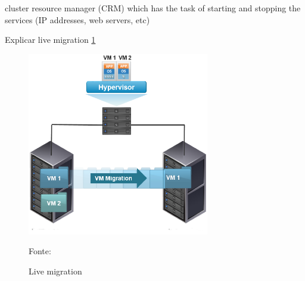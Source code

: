 cluster resource manager (CRM) which has the task of starting and stopping the services (IP addresses, web servers, etc)


Explicar live migration \ref{fig:vms_migration}

\begin{figure}[h!]
 \centering
 \includegraphics[width=300px]{img/vms_migration.eps}
 \caption{Live migration}
 Fonte: \citet{spaniol2015}
 \label{fig:vms_migration}
\end{figure}


